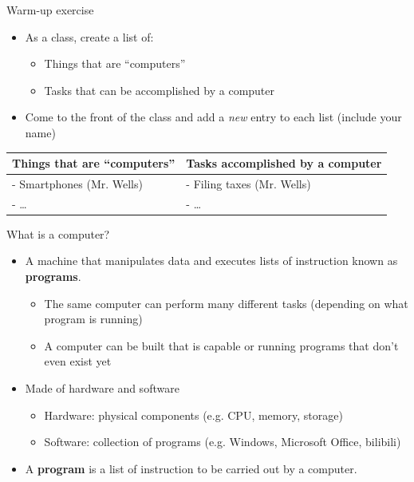 \documentclass[aspectratio=169]{beamer}
\begin{document}
\begin{frame}{Warm-up exercise}
    \begin{itemize}[label=--]
        \item As a class, create a list of:
            \begin{itemize}[label=--,itemsep=5pt]
                \item Things that are ``computers''
                \item Tasks that can be accomplished by a computer
            \end{itemize}
        \item Come to the front of the class and add a \textit{new} entry to each list (include your name)
    \end{itemize}
    \begin{table}
    \centering
        \begin{tabular}{ll}
            \toprule
            \textbf{Things that are ``computers''} & \textbf{Tasks accomplished by a computer} \\
            \midrule
            - Smartphones (Mr. Wells)              & - Filing taxes (Mr. Wells)                           \\
            - \ldots                               & - \ldots                                             \\
        \end{tabular}
    \end{table}   
\end{frame}


\begin{frame}{What is a computer?}
    \begin{itemize}[label=--]
        \item A machine that manipulates data and executes lists of instruction known as \textbf{programs}.
            \begin{itemize}[label=\(\blacktriangleright\),itemsep=5pt]
                \item The same computer can perform many different tasks (depending on what program is running)
                \item A computer can be built that is capable or running programs that don't even exist yet
            \end{itemize}
        \item Made of hardware and software
            \begin{itemize}[label=\(\blacktriangleright\),itemsep=5pt]
                \item Hardware: physical components (e.g. CPU, memory, storage)
                \item Software: collection of programs (e.g. Windows, Microsoft Office, bilibili)
            \end{itemize}
        \item A \textbf{program} is a list of instruction to be carried out by a computer.
    \end{itemize}
\end{frame}
\end{document}
